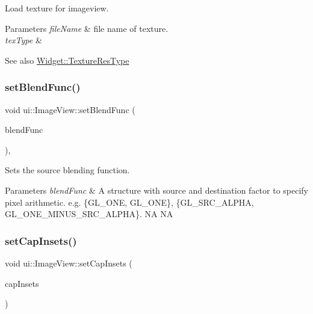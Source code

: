 Load texture for imageview.


\begin{DoxyParams}{Parameters}
{\em file\+Name} & file name of texture. \\
\hline
{\em tex\+Type} & \\
\hline
\end{DoxyParams}
\begin{DoxySeeAlso}{See also}
{\ttfamily \hyperlink{classui_1_1Widget_a040a65ec5ad3b11119b7e16b98bd9af0}{Widget\+::\+Texture\+Res\+Type}} 
\end{DoxySeeAlso}
\mbox{\label{classui_1_1ImageView_a83568955f3596eb310606f4b2181dd9b}} 
\subsubsection{\texorpdfstring{set\+Blend\+Func()}{setBlendFunc()}}
{\footnotesize\ttfamily void ui\+::\+Image\+View\+::set\+Blend\+Func (\begin{DoxyParamCaption}\item[{const \hyperlink{structBlendFunc}{Blend\+Func} \&}]{blend\+Func }\end{DoxyParamCaption})\hspace{0.3cm}{\ttfamily [override]}, {\ttfamily [virtual]}}

Sets the source blending function.


\begin{DoxyParams}{Parameters}
{\em blend\+Func} & A structure with source and destination factor to specify pixel arithmetic. e.\+g. \{G\+L\+\_\+\+O\+NE, G\+L\+\_\+\+O\+NE\}, \{G\+L\+\_\+\+S\+R\+C\+\_\+\+A\+L\+P\+HA, G\+L\+\_\+\+O\+N\+E\+\_\+\+M\+I\+N\+U\+S\+\_\+\+S\+R\+C\+\_\+\+A\+L\+P\+HA\}.  NA  NA \\
\hline
\end{DoxyParams}
\mbox{\label{classui_1_1ImageView_aaca6b6106d235cadd64a19cf2255f218}} 
\subsubsection{\texorpdfstring{set\+Cap\+Insets()}{setCapInsets()}\hspace{0.1cm}{\footnotesize\ttfamily [1/2]}}
{\footnotesize\ttfamily void ui\+::\+Image\+View\+::set\+Cap\+Insets (\begin{DoxyParamCaption}\item[{const \hyperlink{classRect}{Rect} \&}]{cap\+Insets }\end{DoxyParamCaption})}

